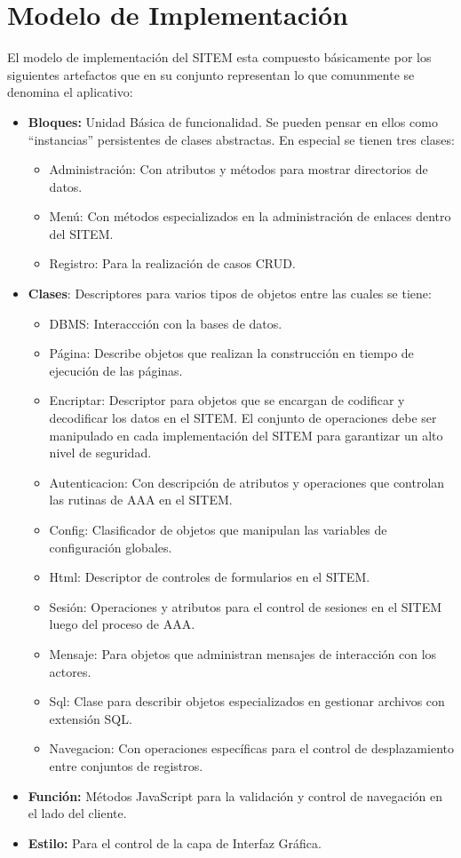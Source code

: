 \chapter{Modelo de Implementación}
\label{modelo_implementacion}

El modelo de implementación del SITEM esta compuesto básicamente por los siguientes artefactos que en su conjunto representan lo que comunmente se denomina el aplicativo:
\begin{itemize}
\item \textbf{Bloques:} Unidad Básica de funcionalidad. Se pueden pensar en ellos como “instancias” persistentes de clases abstractas. En especial se tienen tres clases:
\begin{itemize}
\item Administración: Con atributos y métodos para mostrar directorios de datos.
\item Menú: Con métodos especializados en la administración de enlaces dentro del SITEM.
\item Registro: Para la realización de casos CRUD.
\end{itemize}
\item \textbf{Clases}: Descriptores para varios tipos de objetos entre las cuales se tiene:
\begin{itemize}
\item DBMS: Interaccción con la bases de datos.
\item Página: Describe objetos que realizan la construcción en tiempo de ejecución de las páginas.
\item Encriptar: Descriptor para objetos que se encargan de codificar y decodificar los datos en el SITEM. El conjunto de operaciones debe ser manipulado en cada implementación del SITEM para garantizar un alto nivel de seguridad.
\item Autenticacion: Con descripción de atributos y operaciones que controlan las rutinas de AAA en el SITEM.
\item Config: Clasificador de objetos que manipulan las variables de configuración globales.
\item Html: Descriptor de controles de formularios en el SITEM.
\item Sesión: Operaciones y atributos para el control de sesiones en el SITEM luego del proceso de AAA.
\item Mensaje: Para objetos que administran mensajes de interacción con los actores.
\item Sql: Clase para describir objetos especializados en gestionar archivos con extensión SQL.
\item Navegacion: Con operaciones específicas para el control de desplazamiento entre conjuntos de registros.
\end{itemize}
\item \textbf{Función:} Métodos JavaScript para la validación y control de navegación en el lado del cliente.
\item \textbf{Estilo:} Para el control de la capa de Interfaz Gráfica.
\end{itemize}

